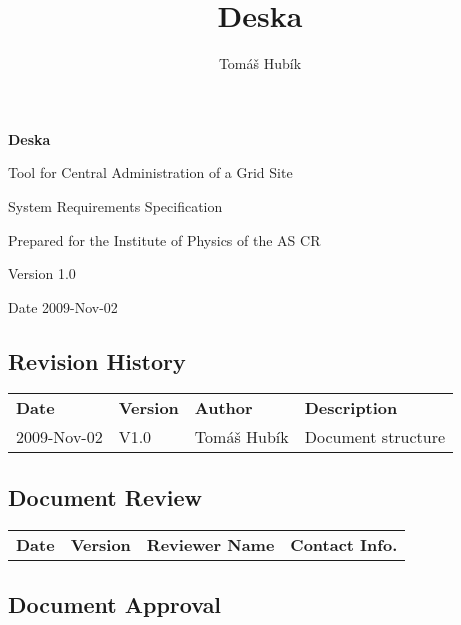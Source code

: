 \documentclass[12pt]{article}
\author{Tomáš Hubík}
\title{Deska}
\begin{document}
{\Huge \textbf{Deska}}

\vspace{0.2in}

{\large Tool for Central Administration of a Grid Site}

\vspace{0.5in}

{\large System Requirements Specification}

\vspace{0.2in}

{\large Prepared for the Institute of Physics of the AS CR}

\vspace{0.2in}

{\large Version 1.0}

\vspace{0.2in}

{\large Date 2009-Nov-02}

\vspace{0.5in}

\subsection*{Revision History}

\begin{table}[!h]
	\begin{tabular}{l l l l}
		\textbf{Date} & \textbf{Version} & \textbf{Author} & \textbf{Description} \\
		2009-Nov-02 & V1.0 & Tomáš Hubík & Document structure \\
	\end{tabular}
	\label{tab:RevisionHistory}
\end{table}


\subsection*{Document Review}

\begin{table}[!h]
	\begin{tabular}{l l l l}
		\textbf{Date} & \textbf{Version} & \textbf{Reviewer Name} & \textbf{Contact Info.} \\
	\end{tabular}
	\label{tab:DocumentReview}
\end{table}


\subsection*{Document Approval}
\end{document}
